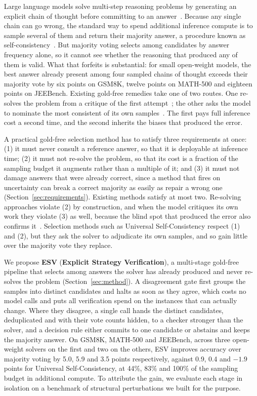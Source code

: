 \documentclass[letterpaper]{article} %
\newcommand{\method}{\textsc{ESV}}   %
\begin{document}
Large language models solve multi-step reasoning problems by generating an
explicit chain of thought before committing to an answer~\cite{wei2022chain}. Because any single chain can go wrong, the standard
way to spend additional inference compute is to sample several of them and return their majority answer, a procedure known as self-consistency~\cite{wang2022self}. But majority voting selects among candidates by answer frequency alone, so it cannot see whether the reasoning that produced any of them is valid. What that forfeits is
substantial: for small open-weight models, the best answer already present among four sampled chains of thought exceeds their majority vote by six points on GSM8K, twelve points on MATH-500 and eighteen points on JEEBench. Existing gold-free remedies take one of two routes. One re-solves the problem from a critique of the first attempt~\cite{madaan2023self,shinn2023reflexion}; the other asks the model to nominate the most consistent of its own samples~\cite{chen2023universal}. The first pays full inference cost a second
time, and the second inherits the biases that produced the error.

A practical gold-free selection method has to satisfy three
requirements at once: (1) it must never consult a reference answer, so
that it is deployable at inference time; (2) it must not re-solve the problem,
so that its cost is a fraction of the sampling budget it augments rather than a
multiple of it; and (3) it must not damage answers that were already correct,
since a method that fires on uncertainty can break a correct majority as easily
as repair a wrong one (Section~\ref{sec:requirements}). Existing methods satisfy
at most two. Re-solving approaches violate (2) by construction, and when the
model critiques its own work they violate (3) as well, because the blind spot
that produced the error also confirms it~\cite{huang2024large}. Selection
methods such as Universal Self-Consistency respect (1) and (2), but they ask the
solver to adjudicate its own samples, and so gain little over the majority vote
they replace.

We propose \textbf{\method{}} (\textbf{Explicit Strategy
Verification}), a multi-stage gold-free pipeline that selects among answers the
solver has already produced and never re-solves the problem
(Section~\ref{sec:method}). A disagreement
gate first groups the samples into distinct candidates and halts as soon as
they agree, which costs no model calls and puts all verification
spend on the instances that can actually change. Where they disagree, a single call hands the
distinct candidates, deduplicated and with their vote counts hidden, to a checker
stronger than the solver, and a decision rule either commits to one candidate or
abstains and keeps the majority answer. On
GSM8K, MATH-500 and JEEBench, across three open-weight solvers on the first and
two on the others, \method{} improves accuracy over majority voting by 5.0, 5.9
and 3.5 points respectively, against 0.9, 0.4 and $-1.9$ points for Universal
Self-Consistency, at 44\%, 83\% and 100\% of the sampling budget in additional
compute. To attribute the gain, we evaluate each stage in isolation on a
benchmark of structural perturbations we built for the purpose.
\end{document}
